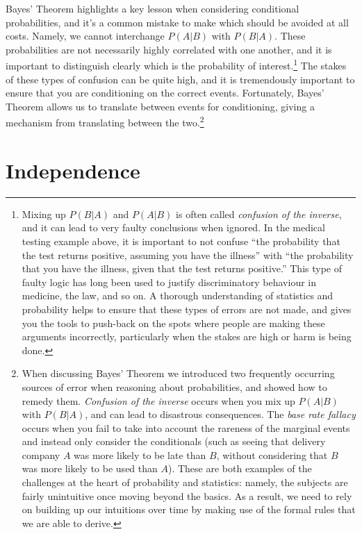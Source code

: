 \documentclass[
  letterpaper,
  DIV=11,
  numbers=noendperiod]{scrreprt}
\theoremstyle{definition}
\theoremstyle{definition}
\theoremstyle{definition}
\theoremstyle{remark}
\begin{document}
Bayes' Theorem highlights a key lesson when considering conditional
probabilities, and it's a common mistake to make which should be avoided
at all costs. Namely, we cannot interchange \(P(A|B)\) with \(P(B|A)\).
These probabilities are not necessarily highly correlated with one
another, and it is important to distinguish clearly which is the
probability of interest.\footnote{Mixing up \(P(B|A)\) and \(P(A|B)\) is
  often called \emph{confusion of the inverse}, and it can lead to very
  faulty conclusions when ignored. In the medical testing example above,
  it is important to not confuse ``the probability that the test returns
  positive, assuming you have the illness'' with ``the probability that
  you have the illness, given that the test returns positive.'' This
  type of faulty logic has long been used to justify discriminatory
  behaviour in medicine, the law, and so on. A thorough understanding of
  statistics and probability helps to ensure that these types of errors
  are not made, and gives you the tools to push-back on the spots where
  people are making these arguments incorrectly, particularly when the
  stakes are high or harm is being done.} The stakes of these types of
confusion can be quite high, and it is tremendously important to ensure
that you are conditioning on the correct events. Fortunately, Bayes'
Theorem allows us to translate between events for conditioning, giving a
mechanism from translating between the two.\footnote{When discussing
  Bayes' Theorem we introduced two frequently occurring sources of error
  when reasoning about probabilities, and showed how to remedy them.
  \emph{Confusion of the inverse} occurs when you mix up \(P(A|B)\) with
  \(P(B|A)\), and can lead to disastrous consequences. The \emph{base
  rate fallacy} occurs when you fail to take into account the rareness
  of the marginal events and instead only consider the conditionals
  (such as seeing that delivery company \(A\) was more likely to be late
  than \(B\), without considering that \(B\) was more likely to be used
  than \(A\)). These are both examples of the challenges at the heart of
  probability and statistics: namely, the subjects are fairly
  unintuitive once moving beyond the basics. As a result, we need to
  rely on building up our intuitions over time by making use of the
  formal rules that we are able to derive.}

\section{Independence}\label{independence}
\end{document}
